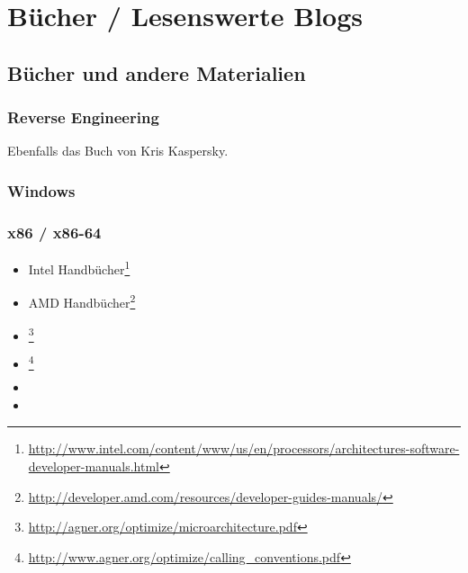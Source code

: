 \chapter{Bücher / Lesenswerte Blogs}

\section{Bücher und andere Materialien}

\subsection{Reverse Engineering}



Ebenfalls das Buch von Kris Kaspersky.

\subsection{Windows}



\subsection{\CCpp}



\subsection{x86 / x86-64}

\label{x86_manuals}
\begin{itemize}
\item Intel Handbücher\footnote{\AlsoAvailableAs \url{http://www.intel.com/content/www/us/en/processors/architectures-software-developer-manuals.html}}

\item AMD Handbücher\footnote{\AlsoAvailableAs \url{http://developer.amd.com/resources/developer-guides-manuals/}}

\item \AgnerFog{}\footnote{\AlsoAvailableAs \url{http://agner.org/optimize/microarchitecture.pdf}}

\item \AgnerFogCC{}\footnote{\AlsoAvailableAs \url{http://www.agner.org/optimize/calling_conventions.pdf}}

\item \IntelOptimization

\item \AMDOptimization
\end{itemize}

